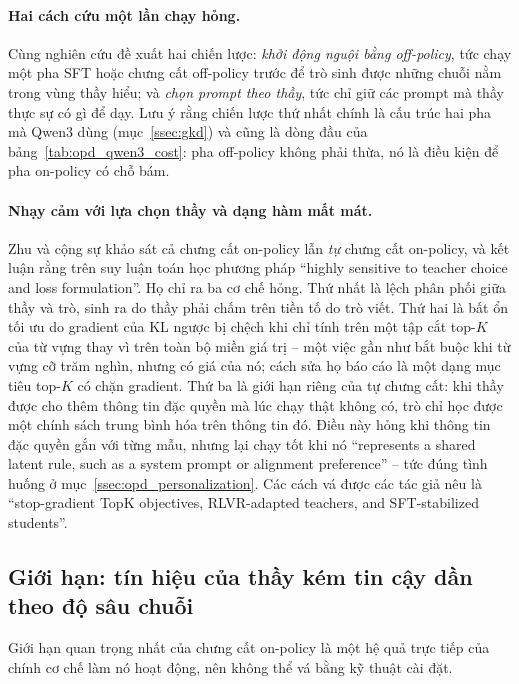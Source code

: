 \paragraph{Hai cách cứu một lần chạy hỏng.} Cùng nghiên cứu đề xuất hai chiến lược: \emph{khởi động nguội bằng off-policy}, tức chạy một pha SFT hoặc chưng cất off-policy trước để trò sinh được những chuỗi nằm trong vùng thầy hiểu; và \emph{chọn prompt theo thầy}, tức chỉ giữ các prompt mà thầy thực sự có gì để dạy. Lưu ý rằng chiến lược thứ nhất chính là cấu trúc hai pha mà Qwen3 dùng (mục~\ref{ssec:gkd}) và cũng là dòng đầu của bảng~\ref{tab:opd_qwen3_cost}: pha off-policy không phải thừa, nó là điều kiện để pha on-policy có chỗ bám.

\paragraph{Nhạy cảm với lựa chọn thầy và dạng hàm mất mát.} Zhu và cộng sự \cite{zhu2026manyfaces} khảo sát cả chưng cất on-policy lẫn \emph{tự} chưng cất on-policy, và kết luận rằng trên suy luận toán học phương pháp ``highly sensitive to teacher choice and loss formulation''. Họ chỉ ra ba cơ chế hỏng. Thứ nhất là lệch phân phối giữa thầy và trò, sinh ra do thầy phải chấm trên tiền tố do trò viết. Thứ hai là bất ổn tối ưu do gradient của KL ngược bị chệch khi chỉ tính trên một tập cắt top-$K$ của từ vựng thay vì trên toàn bộ miền giá trị -- một việc gần như bắt buộc khi từ vựng cỡ trăm nghìn, nhưng có giá của nó; cách sửa họ báo cáo là một dạng mục tiêu top-$K$ có chặn gradient. Thứ ba là giới hạn riêng của tự chưng cất: khi thầy được cho thêm thông tin đặc quyền mà lúc chạy thật không có, trò chỉ học được một chính sách trung bình hóa trên thông tin đó. Điều này hỏng khi thông tin đặc quyền gắn với từng mẫu, nhưng lại chạy tốt khi nó ``represents a shared latent rule, such as a system prompt or alignment preference'' -- tức đúng tình huống ở mục~\ref{ssec:opd_personalization}. Các cách vá được các tác giả nêu là ``stop-gradient TopK objectives, RLVR-adapted teachers, and SFT-stabilized students''.

\subsection{Giới hạn: tín hiệu của thầy kém tin cậy dần theo độ sâu chuỗi}
\label{ssec:opd_limits}

Giới hạn quan trọng nhất của chưng cất on-policy là một hệ quả trực tiếp của chính cơ chế làm nó hoạt động, nên không thể vá bằng kỹ thuật cài đặt.

